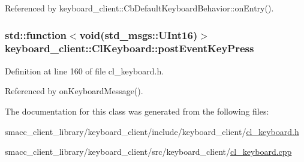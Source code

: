 Referenced by keyboard\+\_\+client\+::\+Cb\+Default\+Keyboard\+Behavior\+::on\+Entry().

\subsubsection[{\texorpdfstring{post\+Event\+Key\+Press}{postEventKeyPress}}]{\setlength{\rightskip}{0pt plus 5cm}std\+::function$<$void(std\+\_\+msgs\+::\+U\+Int16)$>$ keyboard\+\_\+client\+::\+Cl\+Keyboard\+::post\+Event\+Key\+Press}\hypertarget{classkeyboard__client_1_1ClKeyboard_aadd675eea47a012b348a4e6c00e7e9d0}{}\label{classkeyboard__client_1_1ClKeyboard_aadd675eea47a012b348a4e6c00e7e9d0}


Definition at line 160 of file cl\+\_\+keyboard.\+h.



Referenced by on\+Keyboard\+Message().



The documentation for this class was generated from the following files\+:\begin{DoxyCompactItemize}
\item 
smacc\+\_\+client\+\_\+library/keyboard\+\_\+client/include/keyboard\+\_\+client/\hyperlink{cl__keyboard_8h}{cl\+\_\+keyboard.\+h}\item 
smacc\+\_\+client\+\_\+library/keyboard\+\_\+client/src/keyboard\+\_\+client/\hyperlink{cl__keyboard_8cpp}{cl\+\_\+keyboard.\+cpp}\end{DoxyCompactItemize}
